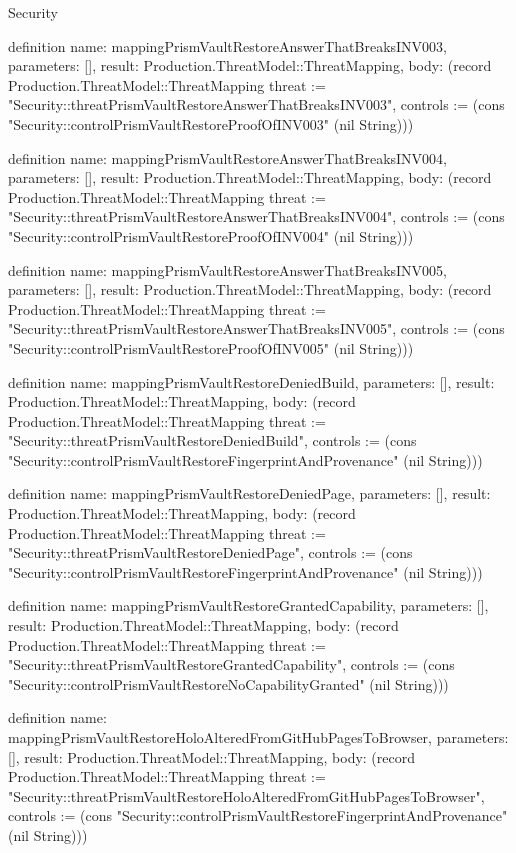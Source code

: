 \begin{lexlean}{Security}
\begin{semanticmodule}
definition{
  name: mappingPrismVaultRestoreAnswerThatBreaksINV003,
  parameters: [],
  result: Production.ThreatModel::ThreatMapping,
  body: (record Production.ThreatModel::ThreatMapping {threat := "Security::threatPrismVaultRestoreAnswerThatBreaksINV003", controls := (cons "Security::controlPrismVaultRestoreProofOfINV003" (nil String))})
}

definition{
  name: mappingPrismVaultRestoreAnswerThatBreaksINV004,
  parameters: [],
  result: Production.ThreatModel::ThreatMapping,
  body: (record Production.ThreatModel::ThreatMapping {threat := "Security::threatPrismVaultRestoreAnswerThatBreaksINV004", controls := (cons "Security::controlPrismVaultRestoreProofOfINV004" (nil String))})
}

definition{
  name: mappingPrismVaultRestoreAnswerThatBreaksINV005,
  parameters: [],
  result: Production.ThreatModel::ThreatMapping,
  body: (record Production.ThreatModel::ThreatMapping {threat := "Security::threatPrismVaultRestoreAnswerThatBreaksINV005", controls := (cons "Security::controlPrismVaultRestoreProofOfINV005" (nil String))})
}

definition{
  name: mappingPrismVaultRestoreDeniedBuild,
  parameters: [],
  result: Production.ThreatModel::ThreatMapping,
  body: (record Production.ThreatModel::ThreatMapping {threat := "Security::threatPrismVaultRestoreDeniedBuild", controls := (cons "Security::controlPrismVaultRestoreFingerprintAndProvenance" (nil String))})
}

definition{
  name: mappingPrismVaultRestoreDeniedPage,
  parameters: [],
  result: Production.ThreatModel::ThreatMapping,
  body: (record Production.ThreatModel::ThreatMapping {threat := "Security::threatPrismVaultRestoreDeniedPage", controls := (cons "Security::controlPrismVaultRestoreFingerprintAndProvenance" (nil String))})
}

definition{
  name: mappingPrismVaultRestoreGrantedCapability,
  parameters: [],
  result: Production.ThreatModel::ThreatMapping,
  body: (record Production.ThreatModel::ThreatMapping {threat := "Security::threatPrismVaultRestoreGrantedCapability", controls := (cons "Security::controlPrismVaultRestoreNoCapabilityGranted" (nil String))})
}

definition{
  name: mappingPrismVaultRestoreHoloAlteredFromGitHubPagesToBrowser,
  parameters: [],
  result: Production.ThreatModel::ThreatMapping,
  body: (record Production.ThreatModel::ThreatMapping {threat := "Security::threatPrismVaultRestoreHoloAlteredFromGitHubPagesToBrowser", controls := (cons "Security::controlPrismVaultRestoreFingerprintAndProvenance" (nil String))})
}


\end{semanticmodule}
\end{lexlean}
